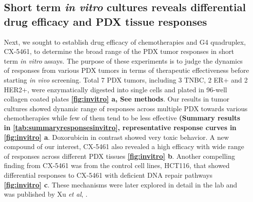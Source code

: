\subsection{Short term \textit {in vitro} cultures reveals differential drug efficacy and PDX tissue responses
}
Next, we sought to establish drug efficacy of chemotherapies and G4 quadruplex, CX-5461, to determine the broad range of the PDX tumor responses in short term \textit{in vitro} assays. The purpose of these experiments is to judge the dynamics of responses from various PDX tumors in terms of therapeutic effectiveness before starting \textit{in vivo} screening. Total 7 PDX tumors, including 3 TNBC, 2 ER+ and 2 HER2+, were enzymatically digested into single cells and plated in 96-well collagen coated plates  \textbf{\autoref{fig:invitro} a, See methods}. 
Our results in tumor cultures showed dynamic range of responses across multiple PDX towards various chemotherapies while few of them tend to be less effective \textbf{(Summary results in \autoref{tab:summaryresponsesinvitro}, representative response curves in \autoref{fig:invitro} a}. Doxorubicin in contrast showed very toxic behavior. A new compound of our interest, CX-5461 also revealed a high efficacy with wide range of responses across different PDX tissues \textbf{\autoref{fig:invitro} b}. Another compelling finding from CX-5461 was from the control cell lines, HCT116, that showed differential responses to CX-5461 with deficient DNA repair pathways \textbf{\autoref{fig:invitro} c}. These mechanisms were later explored in detail in the lab and was published by Xu \textit{et al}, \cite{xu2017cx}. 


